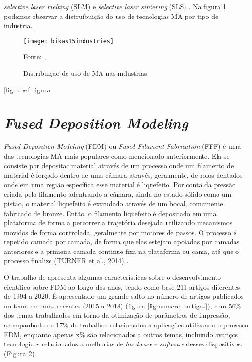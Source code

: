 \textit{selective laser melting} (SLM) e \textit{selective laser
sintering} (SLS) \cite{bikas16}.  
Na figura \ref{fig:MA_industrias} podemos observar a distruibuição do uso de 
tecnologias MA por tipo de industria.   

\begin{figure}[!htb]
    \begin{center}
    \caption{Distribuição de uso de MA nas industrias}
    \texttt{[image: bikas15industries]}

    {\footnotesize Fonte: \citeauthor{bikas16}, \citeyear{bikas16}}
    \label{fig:MA_industrias}
    \end{center}
\end{figure}

\ref{fig:label} figura

\section{\textit{Fused Deposition Modeling}}
\textit{Fused Deposition Modeling} (FDM) ou \textit{Fused Filament Fabrication} 
(FFF) é uma das tecnologias MA mais populares como mencionado anteriormente.
Ela se consiste por depositar material através de um processo 
onde um filamento de material é forçado dentro de uma câmara através,
geralmente, de rolos dentados onde em uma região específica esse 
material é liquefeito. Por conta da pressão criada pelo filamento 
adentrando a câmara, ainda no estado sólido como um pistão, 
o material liquefeito é extrudado através de um bocal, 
comumente fabricado de bronze. Então, o filamento liquefeito é 
depositado em uma plataforma de forma a percorrer a trajetória 
desejada utilizando mecanismos movidos de forma controlada, 
geralmente por motores de passos. O processo é repetido camada 
por camada, de forma que elas estejam apoiadas por camadas 
anteriores e a primeira camada continue fixa na plataforma ou 
cama, até que o processo finalize (TURNER et al., 2014) \cite{turner14}.

O trabalho de \cite{vyavahare20} apresenta algumas 
características sobre o desenvolvimento científico sobre 
FDM ao longo dos anos, tendo como base 211 artigos diferentes 
de 1994 a 2020. É apresentado um grande salto no número de 
artigos publicados no tema em anos recentes (2015 a 2018) 
(figura \ref{fig:numero_artigos}), com 56\% dos temas trabalhados em torno da 
otimização de parâmetros de impressão, acompanhado de 17\% de 
trabalhos relacionados a aplicações utilizando o processo FDM, enquanto apenas x\%
são relacionados a outros temas, incluindo avanços tecnologicos relacionados
a melhorias de \textit{hardware} e \textit{software} desses dispositivos.
(Figura 2).

